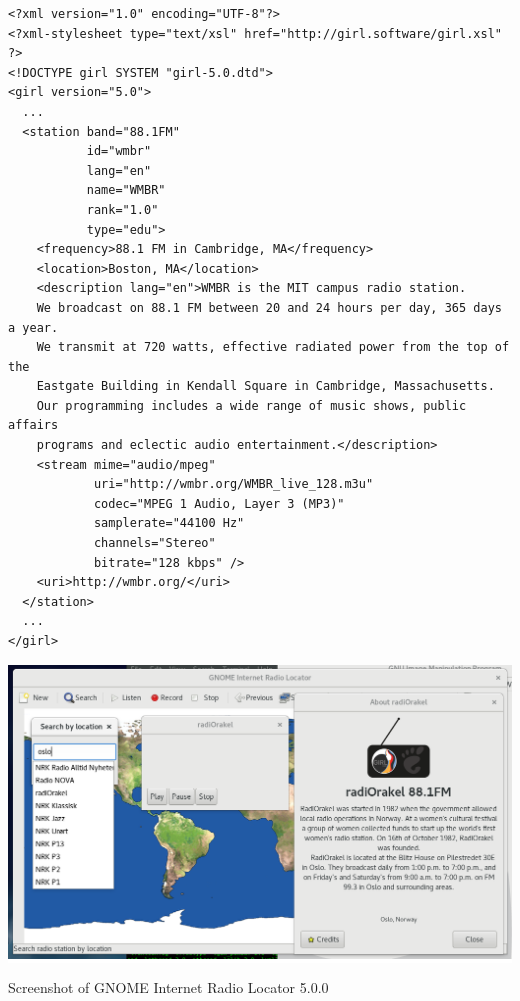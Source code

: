 \documentclass[20pt,landscape]{foils}
\begin{document}

\begin{tiny}
\begin{verbatim}
<?xml version="1.0" encoding="UTF-8"?>
<?xml-stylesheet type="text/xsl" href="http://girl.software/girl.xsl" ?>
<!DOCTYPE girl SYSTEM "girl-5.0.dtd">
<girl version="5.0">
  ...
  <station band="88.1FM"
           id="wmbr"
           lang="en"
           name="WMBR"
           rank="1.0"
           type="edu">
    <frequency>88.1 FM in Cambridge, MA</frequency>
    <location>Boston, MA</location>
    <description lang="en">WMBR is the MIT campus radio station.
    We broadcast on 88.1 FM between 20 and 24 hours per day, 365 days a year.
    We transmit at 720 watts, effective radiated power from the top of the
    Eastgate Building in Kendall Square in Cambridge, Massachusetts.
    Our programming includes a wide range of music shows, public affairs
    programs and eclectic audio entertainment.</description>
    <stream mime="audio/mpeg"
            uri="http://wmbr.org/WMBR_live_128.m3u"
            codec="MPEG 1 Audio, Layer 3 (MP3)"
            samplerate="44100 Hz"
            channels="Stereo"
            bitrate="128 kbps" />
    <uri>http://wmbr.org/</uri>
  </station>
  ...
</girl>
\end{verbatim}
\end{tiny}


\begin{center}

  \colorbox{white}{\includegraphics[width=0.6\hsize]{../data/screenshot.png}}

  {\blueem Screenshot of GNOME Internet Radio Locator 5.0.0}

\end{center}

\end{document}
